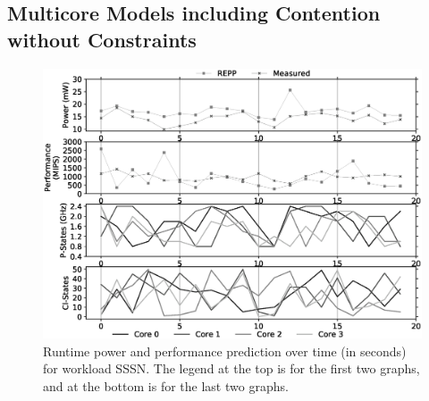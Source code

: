 \subsection{Multicore Models including Contention without Constraints}
\label{subsubsection: technical approach}

\begin{figure}[b!]
    \centering
    \includegraphics[width=\textwidth]{Chapter3/Figs/technical/SSSN-xal-xal-astar-blackscholes-new.eps}
    \caption[Power and performance prediction for workload SSSN]{ Runtime power and performance prediction over time (in seconds) for workload SSSN. The legend at the top is for the first two graphs, and at the bottom is for the last two graphs.}
    \label{fig: power realtimeSSSN}
\end{figure}

